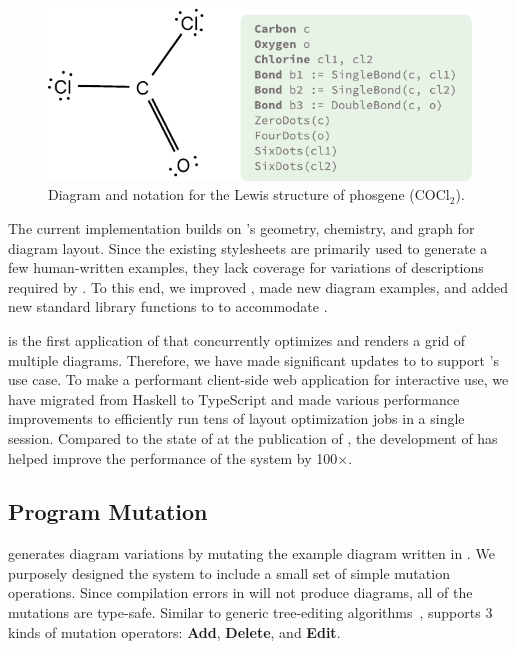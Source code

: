 \begin{figure}[ht]
    \centering
    \includegraphics[width=.6\linewidth]{assets/edgeworth/cocl2-example.pdf}
    \caption{\textmd{Diagram and \Substance notation for the Lewis structure of phosgene (\ensuremath{\mathrm{COCl_2}}).}}
    \label{fig:cocl2-example}
\end{figure}

The current \Edgeworth implementation builds on \Penrose's geometry, chemistry, and graph \Style for diagram layout. Since the existing \Style stylesheets are primarily used to generate a few human-written examples, they lack coverage for variations of \Substance descriptions required by \Edgeworth. To this end, we improved \Style, made new diagram examples, and added new standard library functions to \Penrose to accommodate \Edgeworth.

\Edgeworth is the first application of \Penrose that concurrently optimizes and renders a grid of multiple diagrams. Therefore, we have made significant updates to \Penrose to support \Edgeworth's use case. To make \Edgeworth a performant client-side web application for interactive use, we have migrated from Haskell to TypeScript and made various performance improvements to efficiently run tens of layout optimization jobs in a single session. Compared to the state of \Penrose at the publication of \citet{penrose}, the development of \Edgeworth has helped improve the performance of the system by 100$\times$.


\subsection{Program Mutation}
\label{sec:edgeworth-mutation}

\Edgeworth generates diagram variations by mutating the example diagram written in \Substance. 
We purposely designed the system to include a small set of simple mutation operations. Since compilation errors in \Substance will not produce diagrams, all of the mutations are type-safe. Similar to generic tree-editing algorithms~\cite{Falleri2014}, \Edgeworth supports 3 kinds of mutation operators: \textbf{Add}, \textbf{Delete}, and \textbf{Edit}. 

